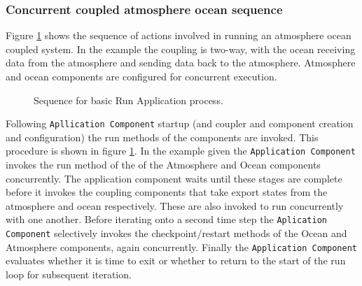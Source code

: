\subsubsection{Concurrent coupled atmosphere ocean sequence}

Figure \ref{fig:RunApplicationDiagram} shows the sequence of actions involved
in running an atmosphere ocean coupled system. In the example the
coupling is two-way, with the ocean receiving data from the atmosphere and 
sending data back to the atmosphere.  Atmosphere and ocean components are 
configured for concurrent execution.

\begin{figure}
\caption[{Basic Run Application}]{Sequence for basic Run Application process.\\}
\label{fig:RunApplicationDiagram}
\end{figure}

Following {\tt Apllication Component} startup (and coupler and component
creation and configuration) the run methods of the components are 
invoked. This procedure is shown in figure \ref{fig:RunApplicationDiagram}. In 
the example given the {\tt Application Component} invokes the run method of 
the of the Atmosphere and Ocean components concurrently. The application 
component waits until these stages are complete before it invokes the coupling 
components that take export states from the atmosphere and ocean respectively. 
These are also invoked to run concurrently with one another. Before iterating 
onto a second time step the {\tt Aplication Component} selectively invokes the 
checkpoint/restart methods of the Ocean and Atmosphere components, again 
concurrently. Finally the {\tt Application Component} evaluates whether it is 
time to exit or whether to return to the start of the run loop for subsequent 
iteration.

